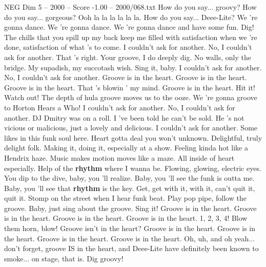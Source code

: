 \begin{textsample}{NEG Dim 5 – 2000 – Score -1.00 – 2000/068.txt}  \label{ex:f5_neg_033}
How do you say... groovy?
How do you say... gorgeous?
Ooh la la la la la la.
How do you say...
Deee-Lite?
We 're gonna dance.
We 're gonna dance.
We 're gonna dance and have some fun.
Dig!
The chills that you spill up my back keep me filled with satisfaction when we 're done, satisfaction of what 's to come.
I couldn't ask for another.
No, I couldn't ask for another.
That 's right.
Your groove, I do deeply dig.
No walls, only the bridge.
My supadish, my succotash wish.
Sing it, baby.
I couldn't ask for another.
No, I couldn't ask for another.
Groove is in the heart.
Groove is in the heart.
Groove is in the heart.
That 's blowin ' my mind.
Groove is in the heart.
Hit it!
Watch out!
The depth of hula groove moves us to the ooze.
We 're gonna groove to Horton Hears a Who!
I couldn't ask for another.
No, I couldn't ask for another.
DJ Dmitry was on a roll.
I 've been told he can't be sold.
He 's not vicious or malicious, just a lovely and delicious.
I couldn't ask for another.
Some likes in this funk soul here.
Heart gotta deal you won't unknown.
Delightful, truly delight folk.
Making it, doing it, especially at a show.
Feeling kinda hot like a Hendrix haze.
Music makes motion moves like a maze.
All inside of heart especially.
Help of the \textbf{rhythm} where I wanna be.
Flowing, glowing, electric eyes.
You dip to the dive, baby, you 'll realize.
Baby, you 'll see the funk is outta me.
Baby, you 'll see that \textbf{rhythm} is the key.
Get, get with it, with it, can't quit it, quit it.
Stomp on the street when I hear funk beat.
Play pop pipe, follow the groove.
Baby, just sing about the groove.
Sing it!
Groove is in the heart.
Groove is in the heart.
Groove is in the heart.
Groove is in the heart. 1, 2, 3, 4!
Blow them horn, blow!
Groove isn't in the heart?
Groove is in the heart.
Groove is in the heart.
Groove is in the heart.
Groove is in the heart.
Oh, uh, and oh yeah... don't forget, groove IS in the heart, and Deee-Lite have definitely been known to smoke... on stage, that is.
Dig groovy!

\end{textsample}
